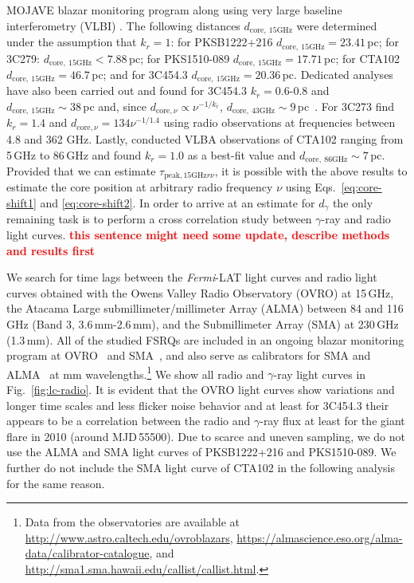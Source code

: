 \documentclass[twocolumn,linenumbers]{aastex62}
\newcommand{\gray}{$\gamma$-ray\xspace}
\newcommand{\fermiLAT}{\emph{Fermi}-LAT\xspace}
\newcommand{\todo}[1]{\textbf{\textcolor{red}{#1}}}
\begin{document}
MOJAVE blazar monitoring program along using very large baseline interferometry (VLBI) \citep{2012A&A...545A.113P,2016AJ....152...12L}.
The following distances $d_\mathrm{core,~15GHz}$ were determined  under the assumption that $k_r = 1$: for PKSB1222+216 $d_\mathrm{core,~15GHz}= 23.41\,$pc; for 3C279: $d_\mathrm{core,~15GHz}<7.88$\,pc; for PKS1510-089 $d_\mathrm{core,~15GHz} = 17.71\,$pc; for 
CTA102 $d_\mathrm{core,~15GHz} =46.7\,$pc; and for 3C454.3 $d_\mathrm{core,~15GHz} = 20.36\,$pc.
Dedicated analyses have also been carried out and found for 3C454.3 $k_r = 0.6$-$0.8$ and $d_\mathrm{core,~15GHz} \sim 38\,$pc and, since $d_{\mathrm{core},\nu}\propto\nu^{-1/k_r}$,  $d_\mathrm{core,~43GHz} \sim 9\,$pc~\citep{2014MNRAS.437.3396K}. 
For 3C273 \citet{2013ARep...57...34V} find $k_r = 1.4$ and $d_{\mathrm{core},\nu} = 134\nu^{-1/1.4}$ using radio observations at frequencies between 4.8 and 362 GHz.
Lastly, \citet{2015A&A...576A..43F} conducted VLBA observations of CTA102 ranging from 5\,GHz to 86\,GHz and found $k_r = 1.0$ as a best-fit value and $d_{\mathrm{core,~86GHz}}\sim7\,$pc.
Provided that we can estimate $\tau_{\mathrm{peak,15GHz}r\nu}$, it is possible with the above results to estimate the core position at arbitrary radio frequency $\nu$ using Eqs.~\ref{eq:core-shift1} and \ref{eq:core-shift2}.
In order to arrive at an estimate for $d_\gamma$ the only remaining task is to perform a cross correlation study between \gray and radio light curves.
\todo{this sentence might need some update, describe methods and results first}

We search for time lags between the \fermiLAT light curves and radio light curves obtained with the Owens Valley Radio Observatory (OVRO) at 15\,GHz, the Atacama Large submillimeter/millimeter Array (ALMA) between 84 and 116\,GHz (Band 3, 3.6\,mm-2.6\,mm), and the Submillimeter Array (SMA) at 230\,GHz (1.3\,mm). 
All of the studied FSRQs are included in an ongoing blazar monitoring program at OVRO~\citep{2011ApJS..194...29R} and SMA~\citep{2007ASPC..375..234G}, and also serve as calibrators for SMA and ALMA~\citep{2018MNRAS.478.1512B} at mm wavelengths.\footnote{Data from the observatories are available at \url{http://www.astro.caltech.edu/ovroblazars}, \url{https://almascience.eso.org/alma-data/calibrator-catalogue}, and \url{http://sma1.sma.hawaii.edu/callist/callist.html}.}
We show all radio and \gray light curves in Fig.~\ref{fig:lc-radio}.
It is evident that the OVRO light curves show variations and longer time scales and less flicker noise behavior and at least for 3C454.3 their appears to be a correlation between the radio and \gray flux at least for the giant flare in 2010 (around MJD\,55500). 
Due to scarce and uneven sampling, we do not use the ALMA and SMA light curves of PKSB1222+216 and PKS1510-089.
We further do not include the SMA light curve of CTA102 in the following analysis for the same reason.
\end{document}
